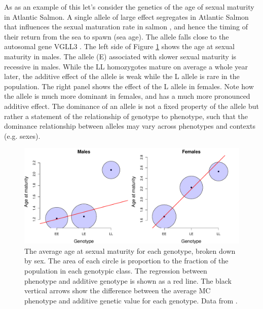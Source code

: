 As as an example of this let's consider the genetics of the age of sexual maturity in Atlantic Salmon. A single allele of large effect segregates in Atlantic Salmon that influences the sexual maturation rate in salmon \citep{ayllon2015vgll3,barson2015sex}, and hence the timing of their return from the sea to spawn (sea age). The allele falls close to the autosomal gene VGLL3 \citep[variation at this gene in humans also influences the timing of puberty[]{cousminer2013genome}. The left side of Figure \ref{fig:salmon_add_dom} shows the age at  sexual maturity in males. The allele (E) associated with slower sexual maturity is recessive in males. While the LL homozygotes mature on average a whole year later, the additive effect of the allele is weak while the L allele is rare in the population. The right panel shows the effect of the L allele in females. Note how the allele is much more dominant in females, and has a much more pronounced additive effect. The dominance of an allele is not a fixed property of the allele but rather a statement of the relationship of genotype to phenotype, such that the dominance relationship between alleles may vary across phenotypes and contexts (e.g. sexes).  



\begin{figure}
\begin{center}
\includegraphics[width=\textwidth]{Journal_figs/Quant_gen/salmon_age/Salmon_age_dom.pdf}
\end{center}
\caption{The average age at sexual maturity for each genotype, broken
  down by sex. 
The area of each circle is proportion to the fraction of
the population in each genotypic class. The regression between phenotype and additive genotype is
  shown as a red line. The black vertical arrows show the difference
between the average MC phenotype and additive genetic value for each genotype. Data from \citet{barson2015sex}.} \label{fig:salmon_add_dom}
\end{figure}

